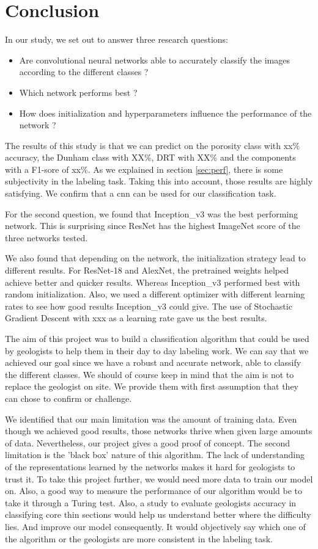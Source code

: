 \chapter{Conclusion}\label{chp:conclusion}
In our study, we set out to answer three research questions: 
\begin{itemize}
    \item Are convolutional neural networks able to accurately classify the images according to the different classes ?
    \item Which network performs best ?
    \item How does initialization and hyperparameters influence the performance of the network ?
\end{itemize}


The results of this study is that we can predict on the porosity class with xx\% accuracy, the Dunham class with XX\%, DRT with XX\% and the components with a F1-sore of xx\%. As we explained in section \ref{sec:perf}, there is some subjectivity in the labeling task. Taking this into account, those results are highly satisfying. We confirm that a \gls{cnn} can be used for our classification task.

For the second question, we found that Inception\_v3 was the best performing network. This is surprising since ResNet has the highest ImageNet score of the three networks tested.

We also found  that depending on the network, the initialization strategy  lead to different results. For ResNet-18 and AlexNet, the pretrained weights helped achieve better and quicker results. Whereas Inception\_v3 performed best with random initialization. Also, we used a different optimizer with different learning rates to see how good results Inception\_v3 could give. The use of Stochastic Gradient Descent with xxx as a learning rate gave us the best results.

The aim of this project was to build a classification algorithm that could be used by geologists to help them in their day to day labeling work. We can say that we achieved our goal since we have a robust and accurate network, able to classify the different classes. We should of course keep in mind that the aim is not to replace the geologist on site. We provide them with first assumption that they can chose to confirm or challenge. 

We identified that our main limitation was the amount of training data. Even though we achieved good results, those networks thrive when given large amounts of data. Nevertheless, our project gives a good proof of concept. The second limitation is the 'black box' nature of this algorithm. The lack of understanding of the representations learned by the networks makes it hard for geologists to trust it.
To take this project further, we would need more data to train our model on. Also, a good way to measure the performance of our algorithm would be to take it through a Turing test. Also, a study to evaluate geologists accuracy in classifying core thin sections would help us understand better where the difficulty lies. And improve  our model consequently. It would objectively say which one of the algorithm or the geologists are more consistent in the labeling task. 

